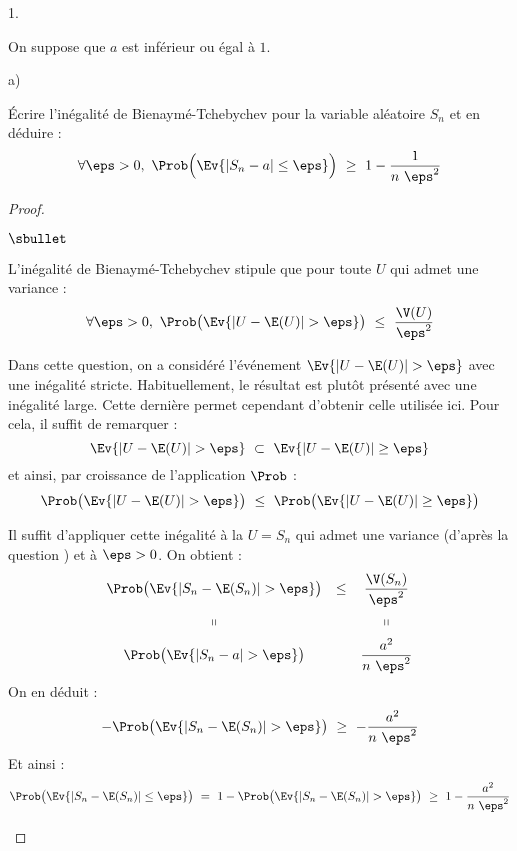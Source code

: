 \begin{noliste}{1.}
\item On suppose que $a$ est inférieur ou égal à $1$.
  \begin{noliste}{a)}
    \setlength{\itemsep}{2mm}
  \item Écrire l'inégalité de Bienaymé-Tchebychev pour la variable
    aléatoire $S_n$ et en déduire :
    \[
    \forall \eps > 0, \ \Prob\Big(\Ev{|S_n - a| \leq \eps} \Big) \
    \geq \ 1 - \dfrac{1}{n \ \eps^2}
    \]
    
    \begin{proof}~%
      \begin{noliste}{$\sbullet$}
      \item L'inégalité de Bienaymé-Tchebychev stipule que pour toute
        \var $U$ qui admet une variance :
        \[
        \forall \eps > 0, \ \Prob\big( \Ev{|U - \E(U)| > \eps}
        \big) \ \leq \ \dfrac{\V(U)}{\eps^2}
        \]
        \begin{remark}
          Dans cette question, on a considéré l'événement $\Ev{ |U -
            \E(U)| > \eps}$ avec une inégalité
          stricte. Habituellement, le résultat est plutôt présenté
          avec une inégalité large. Cette dernière permet cependant
          d'obtenir celle utilisée ici. Pour cela, il suffit de
          remarquer :
          \[
          \Ev{ |U - \E(U)| > \eps} \ \subset \ \Ev{ |U - \E(U)| \geq \eps}
          \]
          et ainsi, par croissance de l'application $\Prob$ : 
          \[
          \Prob\big( \Ev{ |U - \E(U)| > \eps} \big) \ \leq \
          \Prob\big(\Ev{ |U - \E(U)| \geq \eps} \big)
          \]         
        \end{remark}

      \item Il suffit d'appliquer cette inégalité à la \var $U = S_n$
        qui admet une variance (d'après la question ) et à
        $\eps > 0$. On obtient :
        \[
        \begin{array}{cccc}
          \Prob\big( \Ev{|S_n - \E(S_n)| > \eps} \big) & \leq &
          \dfrac{\V(S_n)}{\eps^2} 
          \\[.4cm]
          \shortparallel & & \shortparallel
          \\[.2cm]
          \Prob\big( \Ev{|S_n - a| > \eps} \big) & &
          \dfrac{a^2}{n \ \eps^2}        
        \end{array}        
        \]
        On en déduit :
        \[
        - \Prob\big( \Ev{|S_n - \E(S_n)| > \eps} \big) \ \geq \ -
        \dfrac{a^2}{n \ \eps^2}
        \]
        Et ainsi :
        \[
        \Prob\big( \Ev{|S_n - \E(S_n)| \leq \eps} \big) \ = \ 1 -
        \Prob\big( \Ev{|S_n - \E(S_n)| > \eps} \big) \ \geq \ 1 -
        \dfrac{a^2}{n \ \eps^2}
        \]
        

\end{noliste}
\end{proof}
\end{noliste}
\end{noliste}
